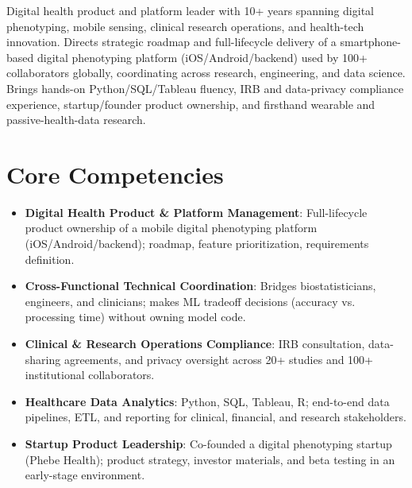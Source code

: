 \documentclass[11pt,a4paper,sans]{moderncv}
\begin{document}
\makecvtitle


\vspace{6pt}
\small{Digital health product and platform leader with 10+ years spanning digital phenotyping, mobile sensing, clinical research operations, and health-tech innovation. Directs strategic roadmap and full-lifecycle delivery of a smartphone-based digital phenotyping platform (iOS/Android/backend) used by 100+ collaborators globally, coordinating across research, engineering, and data science. Brings hands-on Python/SQL/Tableau fluency, IRB and data-privacy compliance experience, startup/founder product ownership, and firsthand wearable and passive-health-data research.}


\section{Core Competencies}
\vspace{1pt}
\begin{itemize}

\item \textbf{Digital Health Product \& Platform Management}: Full-lifecycle product ownership of a mobile digital phenotyping platform (iOS/Android/backend); roadmap, feature prioritization, requirements definition.

\item \textbf{Cross-Functional Technical Coordination}: Bridges biostatisticians, engineers, and clinicians; makes ML tradeoff decisions (accuracy vs. processing time) without owning model code.

\item \textbf{Clinical \& Research Operations Compliance}: IRB consultation, data-sharing agreements, and privacy oversight across 20+ studies and 100+ institutional collaborators.

\item \textbf{Healthcare Data Analytics}: Python, SQL, Tableau, R; end-to-end data pipelines, ETL, and reporting for clinical, financial, and research stakeholders.

\item \textbf{Startup Product Leadership}: Co-founded a digital phenotyping startup (Phebe Health); product strategy, investor materials, and beta testing in an early-stage environment.

\end{itemize}
\end{document}
